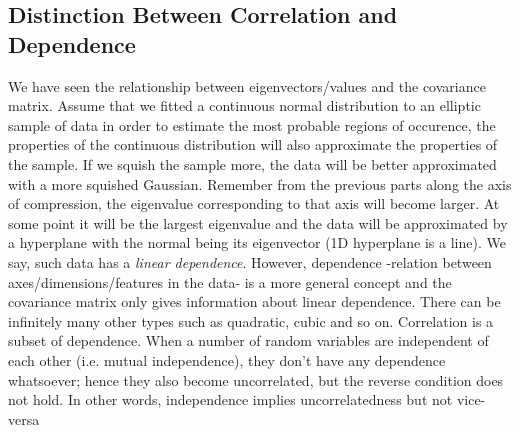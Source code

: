 \documentclass{article}
\numberwithin{equation}{subsection}
\begin{document}
\subsection{Distinction Between Correlation and Dependence}
\label{cor_dep}
We have seen the relationship between eigenvectors/values and the covariance matrix. Assume that we fitted a continuous normal distribution to an elliptic
sample of data in order to estimate the most probable regions of occurence, the properties of the continuous distribution will also approximate the properties of the sample. If we squish the sample more, the data will be better approximated with a more squished Gaussian. Remember from the previous parts along the axis of compression, the eigenvalue corresponding to that axis will become larger. At some point it will be the largest eigenvalue and the data will be approximated by a hyperplane with the normal being its eigenvector (1D hyperplane is a line). We say, such data has a \textit{linear dependence}. However, dependence -relation between axes/dimensions/features in the data- is a more general concept and the covariance matrix only gives information about linear dependence. There can be infinitely many other types such as quadratic, cubic and so on. Correlation is a subset of dependence. When a number of random variables are independent of each other (i.e. mutual independence), they don't have any dependence whatsoever; hence they also become uncorrelated, but the reverse condition does not hold. In other words, independence implies uncorrelatedness but not vice-versa
\end{document}
